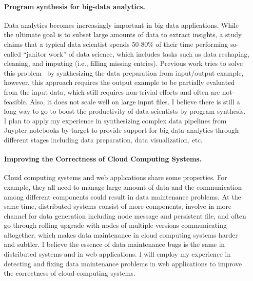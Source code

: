\paragraph{\textbf{Program synthesis for big-data analytics.}} Data analytics becomes increasingly important in
big data applications. While the ultimate goal is to subset large amounts of
data to extract insights, a study~\cite{janitor} claims that a typical data scientist spends 50-80\% of their time performing  so-called ``janitor work'' of data science, which includes tasks such as data reshaping, cleaning, and imputing (i.e., filling missing entries). Previous work tries to solve this problem~\cite{wang2017synthesizing} by synthesizing the data preparation from input/output example, however, this approach requires the output example to be partially evaluated from the input data, which still requires non-trivial efforts and often are not-feasible. Also, it does not scale well on large input files. I believe there is still a long way to go to boost the productivity of data scientists by program synthesis. I plan to apply my experience in synthesizing complex data pipelines from Juypter notebooks by target to provide support for big-data analytics through different stages including data preparation, data visualization, etc. 



\paragraph{\textbf{Improving the Correctness of Cloud Computing Systems. }}

Cloud computing systems and web applications share some properties. For example, they all need to manage large amount of data and the communication among different components could result in data maintenance problems. At the same time, distributed systems consist of more components, involve in more channel for data generation including node message and persistent file, and often go through rolling upgrade with nodes of multiple versions
communicating  altogether, which makes data maintenance in cloud computing systems harder and subtler. I believe the essence of data maintenance bugs is the same in distributed systems and in web applications. I will employ my experience in detecting and fixing data maintenance problems  in web applications to improve the correctness of cloud computing systems.  